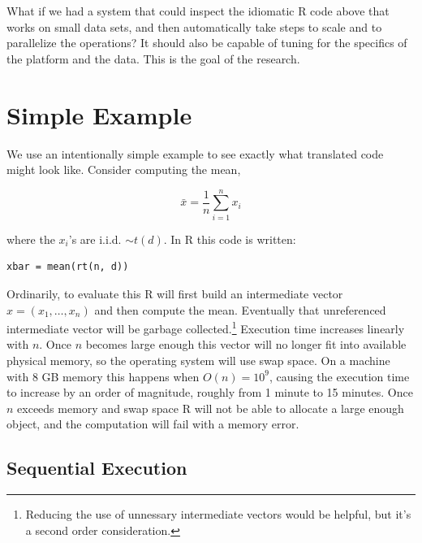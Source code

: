 \documentclass[12pt]{article}
\begin{document}
What if we had a system that could inspect the idiomatic R code above that
works on small data sets, and then automatically take steps to scale and to
parallelize the operations? It should also be capable of tuning for the
specifics of the platform and the data. This is the goal of the research.

\section{Simple Example}


We use an intentionally simple example to see exactly what translated code might look
like.  Consider computing the mean,

\begin{equation}
    \bar{x} = \frac{1}{n} \sum_{i = 1}^n x_i
\label{eq:mean}
\end{equation}

where the $x_i$'s are
i.i.d. $\sim t(d)$.  In R this code is written:

\begin{verbatim}
xbar = mean(rt(n, d))
\end{verbatim}

Ordinarily, to evaluate this R will first build an intermediate vector $x =
(x_1, \dots, x_n)$ and then compute the mean. Eventually that unreferenced
intermediate vector will be garbage collected.\footnote{Reducing the use of
unnessary intermediate vectors would be helpful, but it's a second order
consideration.} Execution time increases linearly with $n$. Once $n$
becomes large enough this vector will no longer fit into available physical
memory, so the operating system will use swap space. On a machine with 8 GB
memory this happens when $O(n) = 10^9$, causing the execution time to
increase by an order of magnitude, roughly from 1 minute to 15 minutes.
Once $n$ exceeds memory and swap space R will not be able to allocate a
large enough object, and the computation will fail with a memory error.

\subsection{Sequential Execution}
\label{sec:sequential}
\end{document}
